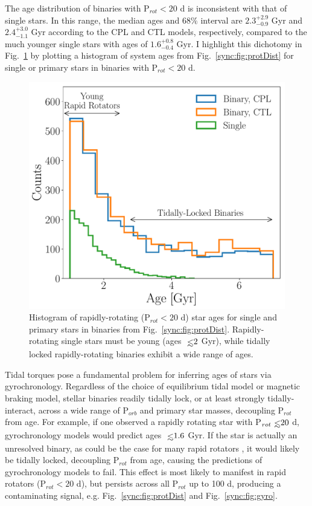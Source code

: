 The age distribution of binaries with P$_{rot} < 20$ d is inconsistent with that of single stars. In this range, the median ages and $68\%$ interval are $2.3^{+2.9}_{-0.9}$ Gyr and $2.4^{+3.0}_{-1.1}$ Gyr according to the CPL and CTL models, respectively, compared to the much younger single stars with ages of $1.6^{+0.8}_{-0.4}$ Gyr. I highlight this dichotomy in Fig.~\ref{sync:fig:protAgeHist} by plotting a histogram of system ages from Fig.~\ref{sync:fig:protDist} for single or primary stars in binaries with P$_{rot} < 20$ d. 

\begin{figure}
	\includegraphics[width=\columnwidth]{protAgeHist.pdf}
   \caption{Histogram of rapidly-rotating (P$_{rot} < 20$ d) star ages for single and primary stars in binaries from Fig.~\ref{sync:fig:protDist}. Rapidly-rotating single stars must be young (ages $\lsim 2$ Gyr), while tidally locked rapidly-rotating binaries exhibit a wide range of ages.}%
    \label{sync:fig:protAgeHist}%
\end{figure}

Tidal torques pose a fundamental problem for inferring ages of stars via gyrochronology. Regardless of the choice of equilibrium tidal model or magnetic braking model, stellar binaries readily tidally lock, or at least strongly tidally-interact, across a wide range of P$_{orb}$ and primary star masses, decoupling P$_{rot}$ from age. For example, if one observed a rapidly rotating star with P$_{rot} \lsim 20$ d, gyrochronology models would predict ages $\lsim 1.6$ Gyr. If the star is actually an unresolved binary, as could be the case for many \kepler rapid rotators \citep{Simonian2018}, it would likely be tidally locked, decoupling P$_{rot}$ from age, causing the predictions of gyrochronology models to fail. This effect is most likely to manifest in rapid rotators (P$_{rot} < 20$ d), but persists across all P$_{rot}$ up to 100 d, producing a contaminating signal, e.g. Fig.~\ref{sync:fig:protDist} and Fig.~\ref{sync:fig:gyro}.

